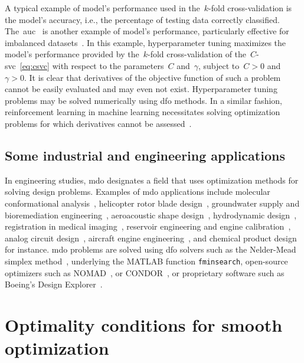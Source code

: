 A typical example of model's performance used in the~$k$-fold cross-validation is the model's accuracy, i.e., the percentage of testing data correctly classified.
The~\gls{auc}~\cite{Hanley_Mcneil_1982} is another example of model's performance, particularly effective for imbalanced datasets~\cite{Bradley_1997}.
In this example, hyperparameter tuning maximizes the model's performance provided by the~$k$-fold cross-validation of the~$C$-\gls{svc}~\cref{eq:csvc} with respect to the parameters~$C$ and~$\gamma$, subject to~$C > 0$ and~$\gamma > 0$.
It is clear that derivatives of the objective function of such a problem cannot be easily evaluated and may even not exist.
Hyperparameter tuning problems may be solved numerically using \gls{dfo} methods.
In a similar fashion, reinforcement learning in machine learning necessitates solving optimization problems for which derivatives cannot be assessed~\cite{Qian_Yu_2021}.

\subsection{Some industrial and engineering applications}

In engineering studies, \gls{mdo} designates a field that uses optimization methods for solving design problems.
Examples of \gls{mdo} applications include molecular conformational analysis~\cite{Alberto_Etal_2004,Meza_Martinez_1994}, helicopter rotor blade design~\cite{Booker_Etal_1998a,Booker_Etal_1998b,Serafini_1998}, groundwater supply and bioremediation engineering~\cite{Fowler_Etal_2008,Mugunthan_Shoemaker_Regis_2005,Yoon_Shoemaker_1999}, aeroacoustic shape design~\cite{Marsden_2004,Marsden_Etal_2004}, hydrodynamic design~\cite{Duvigneau_Visonneau_2004}, registration in medical imaging~\cite{Oeuvray_2005,Oeuvray_Bierlaire_2007}, reservoir engineering and engine calibration~\cite{Langouet_2011}, analog circuit design~\cite{Latorre_Etal_2019}, aircraft engine engineering~\cite{Gazaix_Etal_2019}, and chemical product design~\cite{Sun_Etal_2020} for instance.
\Gls{mdo} problems are solved using \gls{dfo} solvers such as the Nelder-Mead simplex method~\cite{Nelder_Mead_1965}, underlying the MATLAB function \texttt{fminsearch}, open-source optimizers such as NOMAD~\cite{Digabel_2011}, or CONDOR~\cite{Berghen_Bersini_2004}, or proprietary software such as Boeing's Design Explorer~\cite{Cramer_Gablonsky_2004}.

\section{Optimality conditions for smooth optimization}


